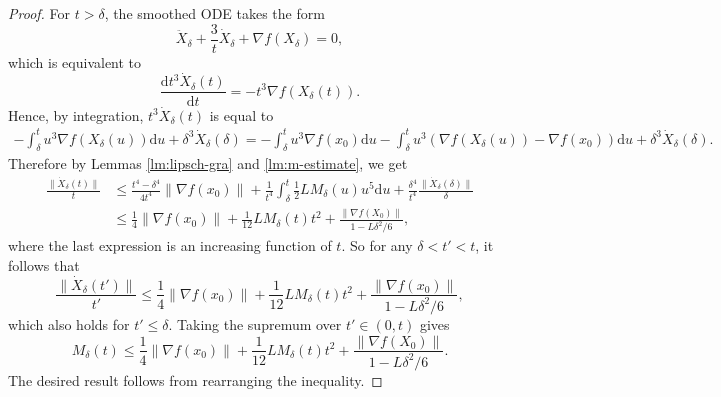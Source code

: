 \documentclass[twoside,11pt]{article}
\newcommand{\der}[1]{\dot #1}
\newcommand{\dder}[1]{\ddot #1}
\newcommand{\norm}[1]{\|#1\|}
\newcommand{\inverse}[1]{\frac{1}{#1}}
\renewcommand{\d}{{\mathrm{d}}}
\def\half{\frac{1}{2}}
\begin{document}
\begin{proof}
For $t > \delta$, the smoothed ODE takes the form
\[
\dder{X_{\delta}} + \frac{3}{t}\der{X_{\delta}} + \nabla f(X_{\delta}) = 0,
\]
which is equivalent to
$$\frac{\d t^3\der{X_{\delta}}(t)}{\d t} = -t^3\nabla f(X_{\delta}(t)).$$
Hence, by integration, $t^3\der{X_{\delta}}(t)$ is equal to
\begin{multline*}
 -\int^t_{\delta}u^3\nabla f(X_{\delta}(u))\d u + \delta^3\der{X_{\delta}}(\delta) = -\int^t_{\delta}u^3\nabla f(x_0)\d u -\int^t_{\delta}u^3(\nabla f(X_{\delta}(u)) - \nabla f(x_0))\d u + \delta^3\der{X_{\delta}}(\delta).
\end{multline*}
Therefore by Lemmas \ref{lm:lipsch-gra} and \ref{lm:m-estimate}, we get
\begin{align*}
\frac{\norm{\der{X_{\delta}}(t)}}{t} &\le \frac{t^4-\delta^4}{4t^4}\norm{\nabla f(x_0)} + \inverse{t^4}\int^t_{\delta}\half LM_{\delta}(u)u^5\d u + \frac{\delta^4}{t^4}\frac{\norm{\der{X_{\delta}}(\delta)}}{\delta}\\
&\le \inverse{4}\norm{\nabla f(x_0)} + \inverse{12}LM_{\delta}(t)t^2 + \frac{\norm{\nabla f(X_0)}}{1 - L\delta^2/6},
\end{align*}
where the last expression is an increasing function of $t$. So for any $\delta < t' < t$, it follows that
\begin{equation}\nonumber
\frac{\norm{\der{X_{\delta}}(t')}}{t'} \le \inverse{4}\norm{\nabla f(x_0)} + \inverse{12}LM_{\delta}(t)t^2 + \frac{\norm{\nabla f(x_0)}}{1 - L\delta^2/6},
\end{equation}
which also holds for $t'\le\delta$. Taking the supremum over $t'\in (0, t)$ gives
\begin{equation}\nonumber
M_{\delta}(t) \le \inverse{4}\norm{\nabla f(x_0)} + \inverse{12}LM_{\delta}(t)t^2 + \frac{\norm{\nabla f(X_0)}}{1 - L\delta^2/6}.
\end{equation}
The desired result follows from rearranging the inequality.
\end{proof}
\end{document}
